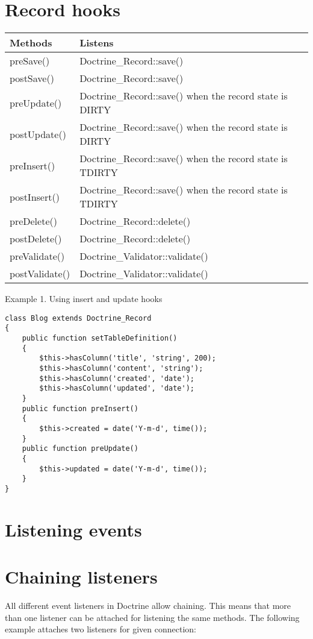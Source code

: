 \documentclass[11pt,a4paper]{report}
\begin{document}
\section{Record hooks}
\begin{tabular}{|l|l|}
\hline
Methods & Listens\\
\hline
preSave() & Doctrine\_Record::save()\\
\hline
postSave() & Doctrine\_Record::save()\\
\hline
preUpdate() & Doctrine\_Record::save() when the record state is DIRTY\\
\hline
postUpdate() & Doctrine\_Record::save() when the record state is DIRTY\\
\hline
preInsert() & Doctrine\_Record::save() when the record state is TDIRTY\\
\hline
postInsert() & Doctrine\_Record::save() when the record state is TDIRTY\\
\hline
preDelete() & Doctrine\_Record::delete()\\
\hline
postDelete() & Doctrine\_Record::delete()\\
\hline
preValidate() & Doctrine\_Validator::validate()\\
\hline
postValidate() & Doctrine\_Validator::validate()\\
\hline
\end{tabular}
Example 1. Using insert and update hooks

\begin{verbatim}
class Blog extends Doctrine_Record
{
    public function setTableDefinition()
    {
        $this->hasColumn('title', 'string', 200);
        $this->hasColumn('content', 'string');
        $this->hasColumn('created', 'date');
        $this->hasColumn('updated', 'date');
    }
    public function preInsert()
    {
        $this->created = date('Y-m-d', time());
    }
    public function preUpdate()
    {
        $this->updated = date('Y-m-d', time());
    }
}
\end{verbatim}

\section{Listening events}
\section{Chaining listeners}
All different event listeners in Doctrine allow chaining. This means that more than one listener can be attached for listening the same methods. The following example attaches two listeners for given connection:
\end{document}
